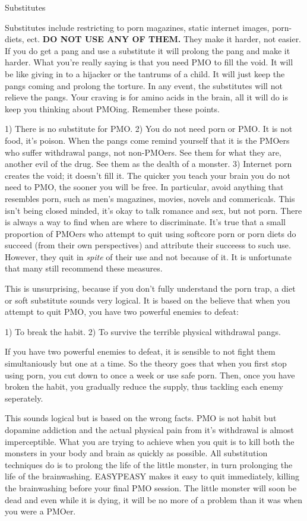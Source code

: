 Substitutes

Substitutes include restricting to porn magazines, static internet images, porn-diets, ect. \textbf{DO NOT USE ANY OF THEM.} They make it harder, not easier. If you do get a pang and use a substitute it will prolong the pang and make it harder. What you're really saying is that you need PMO to fill the void. It will be like giving in to a hijacker or the tantrums of a child. It will just keep the pangs coming and prolong the torture. In any event, the substitutes will not relieve the pangs. Your craving is for amino acids in the brain, all it will do is keep you thinking about PMOing. Remember these points.

  1) There is no substitute for PMO.
  2) You do not need porn or PMO. It is not food, it's poison. When the pangs come remind yourself that it is the PMOers who suffer withdrawal pangs, not non-PMOers. See them for what they are, another evil of the drug. See them as the dealth of a monster.
  3) Internet porn creates the void; it doesn't fill it. The quicker you teach your brain you do not need to PMO, the sooner you will be free. In particular, avoid anything that resembles porn, such as men's magazines, movies, novels and commericals. This isn't being closed minded, it's okay to talk romance and sex, but not porn. There is always a way to find when are where to discriminate. It's true that a small proportion of PMOers who attempt to quit using softcore porn or porn diets do succeed (from their own perspectives) and attribute their succeess to such use. However, they quit in \textit{spite} of their use and not because of it. It is unfortunate that many still recommend these measures.

This is unsurprising, because if you don't fully understand the porn trap, a diet or soft substitute sounds very logical. It is based on the believe that when you attempt to quit PMO, you have two powerful enemies to defeat:

  1) To break the habit.
  2) To survive the terrible physical withdrawal pangs.

If you have two powerful enemies to defeat, it is sensible to not fight them simultaniously but one at a time. So the theory goes that when you first stop using porn, you cut down to once a week or use safe porn. Then, once you have broken the habit, you gradually reduce the supply, thus tackling each enemy seperately.

This sounds logical but is based on the wrong facts. PMO is not habit but dopamine addiction and the actual physical pain from it's withdrawal is almost imperceptible. What you are trying to achieve when you quit is to kill both the monsters in your body and brain as quickly as possible. All substitution techniques do is to prolong the life of the little monster, in turn prolonging the life of the brainwashing. EASYPEASY makes it easy to quit immediately, killing the brainwashing before your final PMO session. The little monster will soon be dead and even while it is dying, it will be no more of a problem than it was when you were a PMOer.

